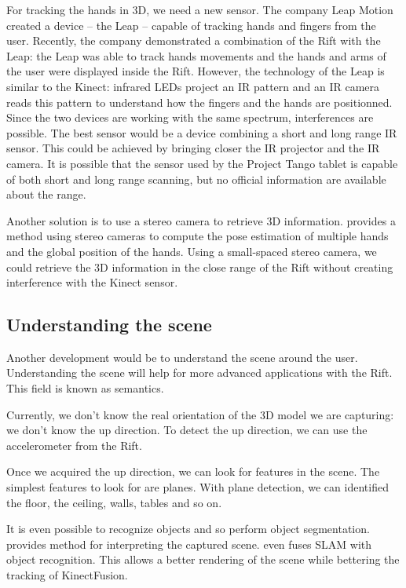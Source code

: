 \documentclass[12pt, twoside]{article}
\begin{document}
For tracking the hands in 3D, we need a new sensor. The company Leap Motion created a device -- the Leap -- capable of tracking hands and fingers from the user. Recently, the company demonstrated a combination of the Rift with the Leap: the Leap was able to track hands movements and the hands and arms of the user were displayed inside the Rift. However, the technology of the Leap is similar to the Kinect: infrared LEDs project an IR pattern and an IR camera reads this pattern to understand how the fingers and the hands are positionned. Since the two devices are working with the same spectrum, interferences are possible. The best sensor would be a device combining a short and long range IR sensor. This could be achieved by bringing closer the IR projector and the IR camera. It is possible that the sensor used by the Project Tango tablet is capable of both short and long range scanning, but no official information are available about the range.

Another solution is to use a stereo camera to retrieve 3D information. \cite{HandStereo} provides a method using stereo cameras to compute the pose estimation of multiple hands and the global position of the hands. Using a small-spaced stereo camera, we could retrieve the 3D information in the close range of the Rift without creating interference with the Kinect sensor.

\subsection{Understanding the scene}
Another development would be to understand the scene around the user. Understanding the scene will help for more advanced applications with the Rift. This field is known as semantics.

Currently, we don't know the real orientation of the 3D model we are capturing: we don't know the up direction. To detect the up direction, we can use the accelerometer from the Rift.

Once we acquired the up direction, we can look for features in the scene. The simplest features to look for are planes. With plane detection, we can identified the floor, the ceiling, walls, tables and so on.

It is even possible to recognize objects and so perform object segmentation. \cite{PCLSeg, SegmetationMotion} provides method for interpreting the captured scene. \cite{SLAMObject} even fuses SLAM with object recognition. This allows a better rendering of the scene while bettering the tracking of KinectFusion.
\end{document}

